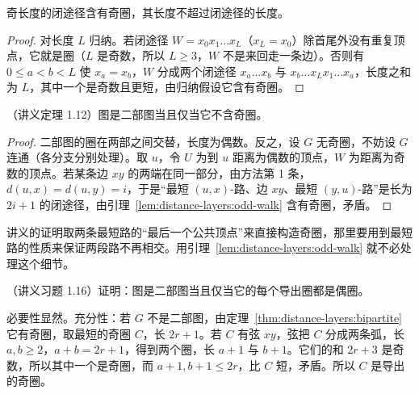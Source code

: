 
\begin{lemma}\label{lem:distance-layers:odd-walk}
奇长度的闭途径含有奇圈，其长度不超过闭途径的长度。
\end{lemma}
\begin{proof}
对长度 $L$ 归纳。若闭途径 $W=x_0x_1\dots x_L$（$x_L=x_0$）除首尾外没有重复顶点，它就是圈（$L$ 是奇数，所以 $L\geqslant3$，$W$ 不是来回走一条边）。否则有 $0\leqslant a<b<L$ 使 $x_a=x_b$，$W$ 分成两个闭途径 $x_a\dots x_b$ 与 $x_b\dots x_Lx_1\dots x_a$，长度之和为 $L$，其中一个是奇数且更短，由归纳假设它含有奇圈。
\end{proof}

\begin{theorem}\label{thm:distance-layers:bipartite}
（讲义定理 1.12）图是二部图当且仅当它不含奇圈。
\end{theorem}
\begin{proof}
二部图的圈在两部之间交替，长度为偶数。反之，设 $G$ 无奇圈，不妨设 $G$ 连通（各分支分别处理）。取 $u$，令 $U$ 为到 $u$ 距离为偶数的顶点，$W$ 为距离为奇数的顶点。若某条边 $xy$ 的两端在同一部分，由方法第 1 条，$d(u,x)=d(u,y)=i$，于是“最短 $(u,x)$-路、边 $xy$、最短 $(y,u)$-路”是长为 $2i+1$ 的闭途径，由引理~\ref{lem:distance-layers:odd-walk} 含有奇圈，矛盾。
\end{proof}

讲义的证明取两条最短路的“最后一个公共顶点”来直接构造奇圈，那里要用到最短路的性质来保证两段路不再相交。用引理~\ref{lem:distance-layers:odd-walk} 就不必处理这个细节。

\begin{workedexample}\label{we:distance-layers:induced-cycles}
（讲义习题 1.16）证明：图是二部图当且仅当它的每个导出圈都是偶圈。
\end{workedexample}
\begin{solution}
必要性显然。充分性：若 $G$ 不是二部图，由定理~\ref{thm:distance-layers:bipartite} 它有奇圈，取最短的奇圈 $C$，长 $2r+1$。若 $C$ 有弦 $xy$，弦把 $C$ 分成两条弧，长 $a,b\geqslant2$，$a+b=2r+1$，得到两个圈，长 $a+1$ 与 $b+1$。它们的和 $2r+3$ 是奇数，所以其中一个是奇圈，而 $a+1,b+1\leqslant2r$，比 $C$ 短，矛盾。所以 $C$ 是导出的奇圈。
\end{solution}

